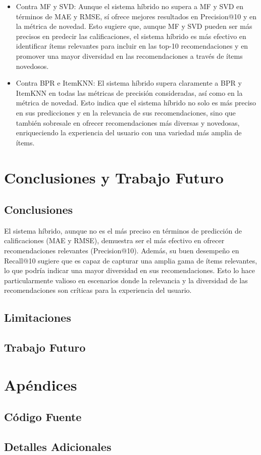 \documentclass[a4paper,12pt]{report}
\begin{document}
    \begin{itemize}
        \item Contra MF y SVD: Aunque el sistema híbrido no supera a MF y SVD en términos de MAE y RMSE, sí ofrece mejores resultados en Precision@10 y en la métrica de novedad. Esto sugiere que, aunque MF y SVD pueden ser más precisos en predecir las calificaciones, el sistema híbrido es más efectivo en identificar ítems relevantes para incluir en las top-10 recomendaciones y en promover una mayor diversidad en las recomendaciones a través de ítems novedosos.
        \item Contra BPR e ItemKNN: El sistema híbrido supera claramente a BPR y ItemKNN en todas las métricas de precisión consideradas, así como en la métrica de novedad. Esto indica que el sistema híbrido no solo es más preciso en sus predicciones y en la relevancia de sus recomendaciones, sino que también sobresale en ofrecer recomendaciones más diversas y novedosas, enriqueciendo la experiencia del usuario con una variedad más amplia de ítems.
    \end{itemize}
        
\chapter{Conclusiones y Trabajo Futuro}
    \section{Conclusiones}

    El sistema híbrido, aunque no es el más preciso en términos de predicción de calificaciones (MAE y RMSE), demuestra ser el más efectivo en ofrecer recomendaciones relevantes (Precision@10). Además, su buen desempeño en Recall@10 sugiere que es capaz de capturar una amplia gama de ítems relevantes, lo que podría indicar una mayor diversidad en sus recomendaciones. Esto lo hace particularmente valioso en escenarios donde la relevancia y la diversidad de las recomendaciones son críticas para la experiencia del usuario.
    \section{Limitaciones}
    \section{Trabajo Futuro}

\appendix
\chapter{Apéndices}
\section{Código Fuente}
\section{Detalles Adicionales}





\end{document}
